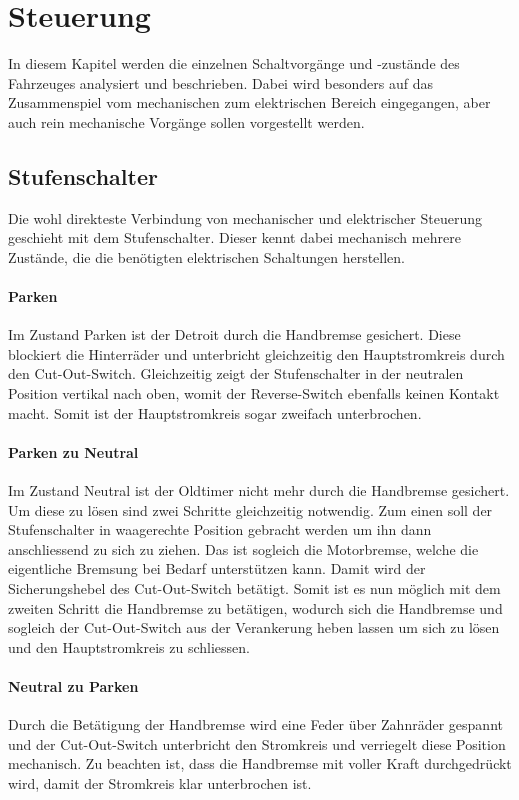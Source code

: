 \section{Steuerung}
In diesem Kapitel werden die einzelnen Schaltvorgänge und -zustände des Fahrzeuges analysiert und beschrieben. Dabei wird besonders auf das Zusammenspiel vom mechanischen zum elektrischen Bereich eingegangen, aber auch rein mechanische Vorgänge sollen vorgestellt werden.

\subsection{Stufenschalter}
Die wohl direkteste Verbindung von mechanischer und elektrischer Steuerung geschieht mit dem Stufenschalter. Dieser kennt dabei mechanisch mehrere Zustände, die die benötigten elektrischen Schaltungen herstellen.

\paragraph{Parken}
Im Zustand Parken ist der Detroit durch die Handbremse gesichert. Diese blockiert die Hinterräder und unterbricht gleichzeitig den Hauptstromkreis durch den Cut-Out-Switch. Gleichzeitig zeigt der Stufenschalter in der neutralen Position vertikal nach oben, womit der Reverse-Switch ebenfalls keinen Kontakt macht. Somit ist der Hauptstromkreis sogar zweifach unterbrochen.

\paragraph{Parken zu Neutral}
Im Zustand Neutral ist der Oldtimer nicht mehr durch die Handbremse gesichert. Um diese zu lösen sind zwei Schritte gleichzeitig notwendig. Zum einen soll der Stufenschalter in waagerechte Position gebracht werden um ihn dann anschliessend zu sich zu ziehen. Das ist sogleich die Motorbremse, welche die eigentliche Bremsung bei Bedarf unterstützen kann. Damit wird der Sicherungshebel des Cut-Out-Switch betätigt. Somit ist es nun möglich mit dem zweiten Schritt die Handbremse zu betätigen, wodurch sich die Handbremse und sogleich der Cut-Out-Switch aus der Verankerung heben lassen um sich zu lösen und den Hauptstromkreis zu schliessen.

\paragraph{Neutral zu Parken}
Durch die Betätigung der Handbremse wird eine Feder über Zahnräder gespannt und der Cut-Out-Switch unterbricht den Stromkreis und verriegelt diese Position mechanisch. Zu beachten ist, dass die Handbremse mit voller Kraft durchgedrückt wird, damit der Stromkreis klar unterbrochen ist.

